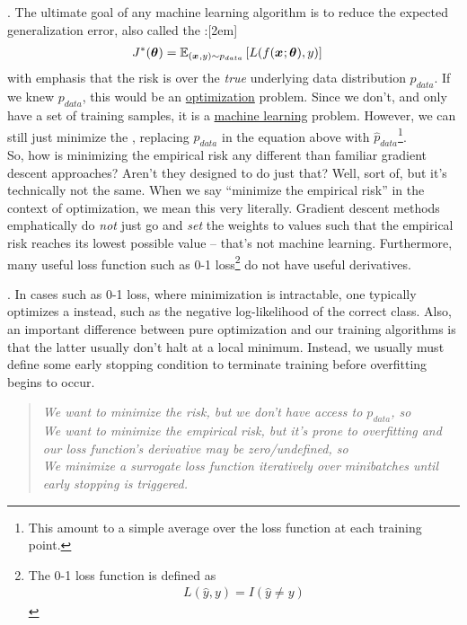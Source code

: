 \documentclass[11pt]{article}
\begin{document}

. The ultimate goal of any machine learning algorithm is to reduce the expected generalization error, also called the :[2em]
\begin{align}
	J^*(\vec \theta) &= \E[(\vec x, y) \sim p_{data}]{ L(f(\vec x; \vec \theta), y)  }
\end{align}
with emphasis that the risk is over the \textit{true} underlying data distribution $p_{data}$. If we knew $p_{data}$, this would be an \underline{optimization} problem. Since we don't, and only have a set of training samples, it is a \underline{machine learning} problem. However, we can still just minimize the , replacing $p_{data}$ in the equation above with $\hat p_{data}$\footnote{This amount to a simple average over the loss function at each training point.}. \\

So, how is minimizing the empirical risk any different than familiar gradient descent approaches? Aren't they designed to do just that? Well, sort of, but it's technically not the same. When we say ``minimize the empirical risk'' in the context of optimization, we mean this very literally. Gradient descent methods emphatically do \textit{not} just go and \textit{set} the weights to values such that the empirical risk reaches its lowest possible value -- that's not machine learning. Furthermore, many useful loss function such as 0-1 loss\footnote{The 0-1 loss function is defined as
	\begin{align}
		L(\hat y, y) = I(\hat y \ne y)
	\end{align}
} do not have useful derivatives. 

\myspace
\p {}. In cases such as 0-1 loss, where minimization is intractable, one typically optimizes a  instead, such as the  negative log-likelihood of the correct class. Also, an important difference between pure optimization and our training algorithms is that the latter usually don't halt at a local minimum. Instead, we usually must define some early stopping condition to terminate training before overfitting begins to occur.  
\vspace{-0.5em}
\begin{quote}
	{\small\itshape
		We want to minimize the risk, but we don't have access to $p_{data}$, so \textellipsis \\
		We want to minimize the empirical risk, but it's prone to overfitting and our loss function's derivative may be zero/undefined, so \textellipsis \\
		We minimize a surrogate loss function iteratively over minibatches until early stopping is triggered.
	}
\end{quote}
\end{document}
